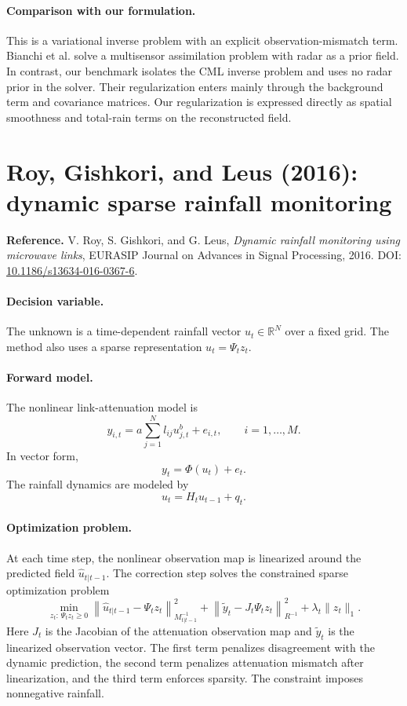 \documentclass[11pt]{article}
\begin{document}
\paragraph{Comparison with our formulation.}
This is a variational inverse problem with an explicit observation-mismatch term.
Bianchi et al. solve a multisensor assimilation problem with radar as a prior field. In contrast, our benchmark isolates the CML inverse problem and uses no radar prior in the solver.
Their regularization enters mainly through the background term and covariance matrices.
Our regularization is expressed directly as spatial smoothness and total-rain terms on the reconstructed field.

\section{Roy, Gishkori, and Leus (2016): dynamic sparse rainfall monitoring}
\textbf{Reference.}
V. Roy, S. Gishkori, and G. Leus,
\emph{Dynamic rainfall monitoring using microwave links},
EURASIP Journal on Advances in Signal Processing, 2016.
DOI: \href{https://doi.org/10.1186/s13634-016-0367-6}{10.1186/s13634-016-0367-6}.

\paragraph{Decision variable.}
The unknown is a time-dependent rainfall vector $u_t\in\mathbb{R}^N$ over a fixed grid.
The method also uses a sparse representation $u_t=\Psi_t z_t$.

\paragraph{Forward model.}
The nonlinear link-attenuation model is
\[
  y_{i,t}
  =
  a\sum_{j=1}^N l_{ij}u_{j,t}^{b} + e_{i,t},
  \qquad i=1,\ldots,M .
\]
In vector form,
\[
  y_t=\Phi(u_t)+e_t .
\]
The rainfall dynamics are modeled by
\[
  u_t=H_tu_{t-1}+q_t .
\]

\paragraph{Optimization problem.}
At each time step, the nonlinear observation map is linearized around the predicted field $\hat{u}_{t|t-1}$.
The correction step solves the constrained sparse optimization problem
\[
  \min_{z_t:\,\Psi_t z_t\geq 0}
  \left\|\hat{u}_{t|t-1}-\Psi_t z_t\right\|^2_{M_{t|t-1}^{-1}}
  +
  \left\|\tilde{y}_t-J_t\Psi_t z_t\right\|^2_{R^{-1}}
  +
  \lambda_t\|z_t\|_1 .
\]
Here $J_t$ is the Jacobian of the attenuation observation map and $\tilde{y}_t$ is the linearized observation vector.
The first term penalizes disagreement with the dynamic prediction, the second term penalizes attenuation mismatch after linearization, and the third term enforces sparsity.
The constraint imposes nonnegative rainfall.
\end{document}
